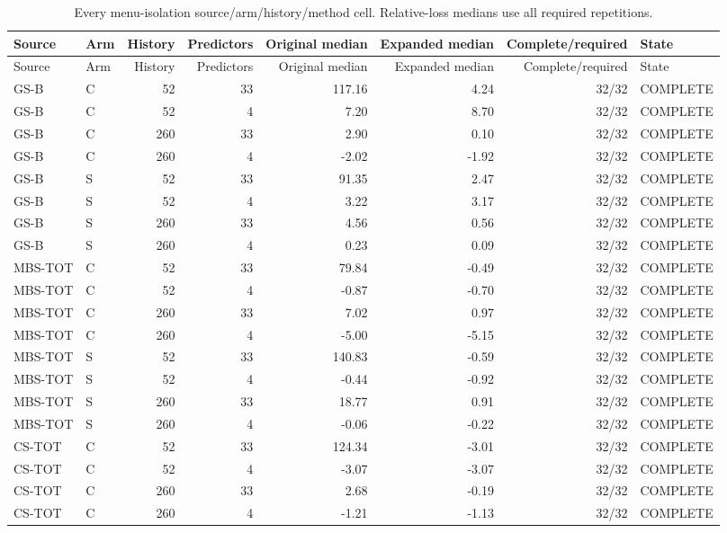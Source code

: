 \begingroup\scriptsize\renewcommand{\arraystretch}{.96}
\begin{longtable}{llrrrrrl}
\caption{Every menu-isolation source/arm/history/method cell. Relative-loss medians use all required repetitions.}\label{tab:v10-menu-full}\\
\toprule Source & Arm & History & Predictors & Original median & Expanded median & Complete/required & State \\\midrule\endfirsthead
\toprule Source & Arm & History & Predictors & Original median & Expanded median & Complete/required & State \\\midrule\endhead
GS-B & C & 52 & 33 & 117.16 & 4.24 & 32/32 & COMPLETE \\
GS-B & C & 52 & 4 & 7.20 & 8.70 & 32/32 & COMPLETE \\
GS-B & C & 260 & 33 & 2.90 & 0.10 & 32/32 & COMPLETE \\
GS-B & C & 260 & 4 & -2.02 & -1.92 & 32/32 & COMPLETE \\
GS-B & S & 52 & 33 & 91.35 & 2.47 & 32/32 & COMPLETE \\
GS-B & S & 52 & 4 & 3.22 & 3.17 & 32/32 & COMPLETE \\
GS-B & S & 260 & 33 & 4.56 & 0.56 & 32/32 & COMPLETE \\
GS-B & S & 260 & 4 & 0.23 & 0.09 & 32/32 & COMPLETE \\
MBS-TOT & C & 52 & 33 & 79.84 & -0.49 & 32/32 & COMPLETE \\
MBS-TOT & C & 52 & 4 & -0.87 & -0.70 & 32/32 & COMPLETE \\
MBS-TOT & C & 260 & 33 & 7.02 & 0.97 & 32/32 & COMPLETE \\
MBS-TOT & C & 260 & 4 & -5.00 & -5.15 & 32/32 & COMPLETE \\
MBS-TOT & S & 52 & 33 & 140.83 & -0.59 & 32/32 & COMPLETE \\
MBS-TOT & S & 52 & 4 & -0.44 & -0.92 & 32/32 & COMPLETE \\
MBS-TOT & S & 260 & 33 & 18.77 & 0.91 & 32/32 & COMPLETE \\
MBS-TOT & S & 260 & 4 & -0.06 & -0.22 & 32/32 & COMPLETE \\
CS-TOT & C & 52 & 33 & 124.34 & -3.01 & 32/32 & COMPLETE \\
CS-TOT & C & 52 & 4 & -3.07 & -3.07 & 32/32 & COMPLETE \\
CS-TOT & C & 260 & 33 & 2.68 & -0.19 & 32/32 & COMPLETE \\
CS-TOT & C & 260 & 4 & -1.21 & -1.13 & 32/32 & COMPLETE \\

\end{longtable}
